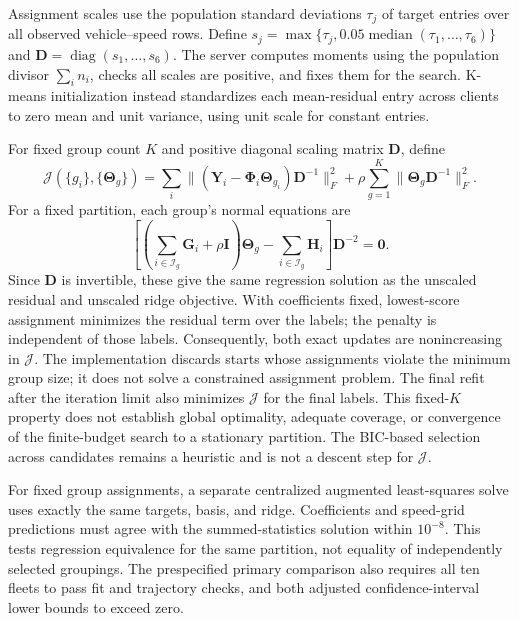 \documentclass[10pt]{article}
\begin{document}
Assignment scales use the population standard deviations $\tau_j$ of target
entries over all observed vehicle--speed rows. Define
$s_j=\max\{\tau_j,0.05\operatorname{median}(\tau_1,\ldots,\tau_6)\}$
and $\boldsymbol D=\operatorname{diag}(s_1,\ldots,s_6)$.
The server computes moments using the population divisor $\sum_i n_i$,
checks all scales are positive, and fixes them for the search. K-means
initialization instead standardizes each mean-residual entry across clients
to zero mean and unit variance, using unit scale for constant entries.

\begingroup\color{focusedrevision}
For fixed group count $K$ and positive diagonal scaling matrix
$\boldsymbol D$, define
\[
 \mathcal J(\{g_i\},\{\boldsymbol\Theta_g\})=
 \sum_i\|(\boldsymbol Y_i-\boldsymbol\Phi_i\boldsymbol\Theta_{g_i})
                  \boldsymbol D^{-1}\|_F^2
 +\rho\sum_{g=1}^{K}\|\boldsymbol\Theta_g\boldsymbol D^{-1}\|_F^2.
\]
For a fixed partition, each group's normal equations are
\[
 \left[\left(\sum_{i\in\mathcal I_g}\boldsymbol G_i+\rho\boldsymbol I\right)
 \boldsymbol\Theta_g-\sum_{i\in\mathcal I_g}\boldsymbol H_i\right]
 \boldsymbol D^{-2}=\boldsymbol 0.
\]
Since $\boldsymbol D$ is invertible, these give the same regression solution
as the unscaled residual and unscaled ridge objective. With coefficients
fixed, lowest-score assignment minimizes the residual term over the labels;
the penalty is independent of those labels. Consequently, both exact updates
are nonincreasing in $\mathcal J$. The implementation discards starts whose
assignments violate the minimum group size; it does not solve a constrained
assignment problem. The final refit after the iteration limit also minimizes
$\mathcal J$ for the final labels. This fixed-$K$ property does not establish
global optimality, adequate coverage, or convergence of the finite-budget
search to a stationary partition. The BIC-based selection across candidates
remains a heuristic and is not a descent step for $\mathcal J$.
\endgroup

For fixed group assignments, a separate centralized augmented least-squares
solve uses exactly the same targets, basis, and ridge. Coefficients and
speed-grid predictions must agree with the summed-statistics solution
within $10^{-8}$. This tests regression equivalence for the same partition,
not equality of independently selected groupings. The prespecified primary
comparison also requires all ten fleets to pass fit and trajectory checks,
and both adjusted confidence-interval lower bounds to exceed zero.
\end{document}
